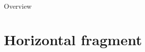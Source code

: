 \documentclass[aspectratio=1610,mathserif]{beamer}
\begin{document}
\begin{frame}{Overview}
\tableofcontents
\end{frame}

\section{Horizontal fragment}

\end{document}

